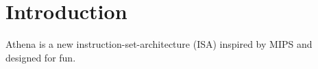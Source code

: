 \chapter{Introduction}

Athena is a new instruction-set-architecture (ISA) inspired by MIPS and designed for fun.
